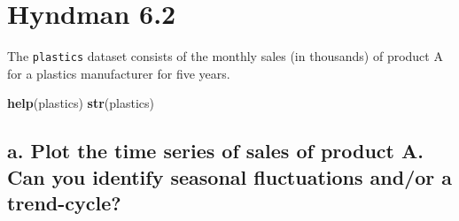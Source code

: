 \documentclass[openany]{book}
\newenvironment{Shaded}{\begin{snugshade}}{\end{snugshade}}
\newcommand{\KeywordTok}[1]{\textcolor[rgb]{0.13,0.29,0.53}{\textbf{#1}}}
\newcommand{\NormalTok}[1]{#1}
\renewenvironment{quote}{\begin{myquote}}{\end{myquote}}
\begin{document}
\hypertarget{hyndman-6.2}{%
\section{Hyndman 6.2}\label{hyndman-6.2}}

\begin{quote}
The \texttt{plastics} dataset consists of the monthly sales (in thousands) of product A for a plastics manufacturer for five years.
\end{quote}

\begin{Shaded}
\begin{Highlighting}[]
\KeywordTok{help}\NormalTok{(plastics)}
\KeywordTok{str}\NormalTok{(plastics)}
\end{Highlighting}
\end{Shaded}

\hypertarget{a.-plot-the-time-series-of-sales-of-product-a.-can-you-identify-seasonal-fluctuations-andor-a-trend-cycle}{%
\subsection{a. Plot the time series of sales of product A. Can you identify seasonal fluctuations and/or a trend-cycle?}\label{a.-plot-the-time-series-of-sales-of-product-a.-can-you-identify-seasonal-fluctuations-andor-a-trend-cycle}}
\end{document}
